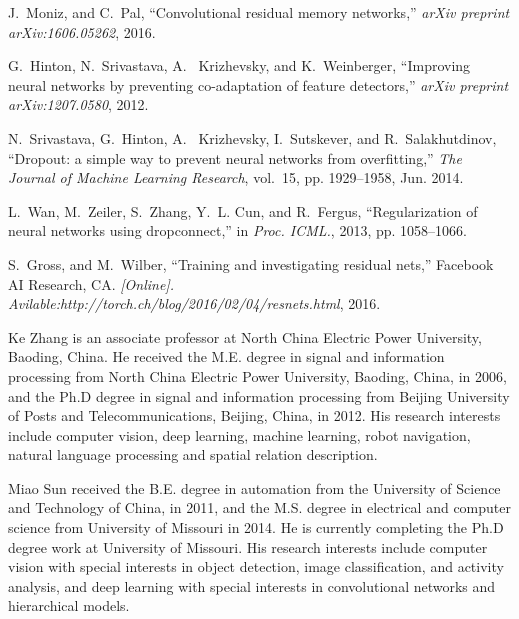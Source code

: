 \documentclass[journal]{IEEEtran}
\begin{document}
\begin{thebibliography}{1}
J.~Moniz, and C.~Pal, ``Convolutional residual memory networks,'' \emph{arXiv preprint arXiv:1606.05262}, 2016.

G.~Hinton, N.~Srivastava, A. ~Krizhevsky, and K.~Weinberger, ``Improving neural networks by preventing co-adaptation of feature detectors,'' \emph{arXiv preprint arXiv:1207.0580}, 2012.

N.~Srivastava, G.~Hinton, A. ~Krizhevsky, I.~Sutskever, and R.~Salakhutdinov, ``Dropout: a simple way to prevent neural networks from overfitting,'' \emph{The Journal of Machine Learning Research}, vol.~15, pp. 1929--1958, Jun. 2014.

L.~Wan, M.~Zeiler, S.~Zhang, Y.~L. Cun, and R.~Fergus, ``Regularization of neural networks using dropconnect,'' in
  \emph{Proc. ICML.}, 2013, pp. 1058--1066.

S.~Gross, and M.~Wilber, ``Training and investigating residual nets,'' Facebook AI Research, CA. \emph{[Online]. Avilable:http://torch.ch/blog/2016/02/04/resnets.html}, 2016.






\end{thebibliography}

\begin{IEEEbiography}{Ke Zhang}
is an associate professor at North China Electric Power University, Baoding, China. He received the M.E. degree in signal and information processing from North China Electric Power University, Baoding, China, in 2006, and the Ph.D degree in signal and information processing from Beijing University of Posts and Telecommunications, Beijing, China, in 2012. His research interests include computer vision, deep learning, machine learning, robot navigation, natural language processing and spatial relation description.
\end{IEEEbiography}

\begin{IEEEbiography}{Miao Sun}
received the B.E. degree in automation from the University of Science and Technology of China, in 2011, and the M.S. degree in electrical and computer science from University of Missouri in 2014. He is currently completing the Ph.D degree work at University of Missouri. His research interests include computer vision with special interests in object detection, image classification, and activity analysis, and deep learning with special interests in convolutional networks and hierarchical models.
\end{IEEEbiography}
\end{document}
